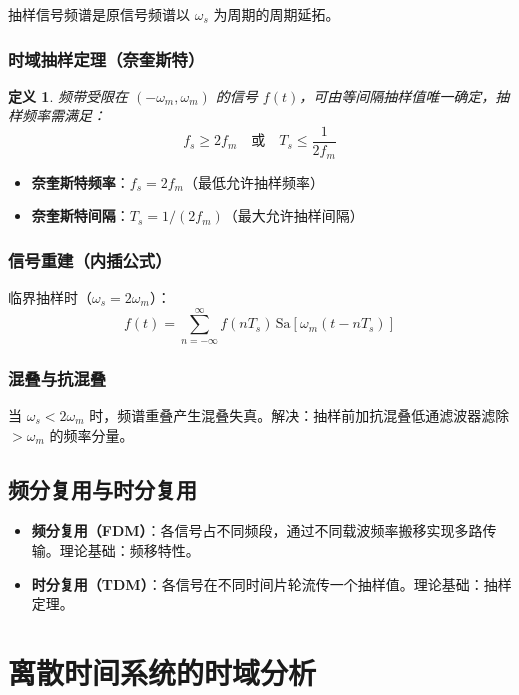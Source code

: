 \documentclass[11pt,a4paper]{ctexart}
\newtheorem{definition}{定义}[section]
\newcommand{\Sa}{\mathrm{Sa}}           %
\begin{document}
抽样信号频谱是原信号频谱以 $\omega_s$ 为周期的周期延拓。

\subsubsection{时域抽样定理（奈奎斯特）}

\begin{definition}
频带受限在 $(-\omega_m, \omega_m)$ 的信号 $f(t)$，可由等间隔抽样值唯一确定，抽样频率需满足：
\[
\boxed{f_s \ge 2f_m}\quad\text{或}\quad\boxed{T_s \le \frac{1}{2f_m}}
\]
\end{definition}

\begin{itemize}
    \item \textbf{奈奎斯特频率}：$f_s = 2f_m$（最低允许抽样频率）
    \item \textbf{奈奎斯特间隔}：$T_s = 1/(2f_m)$（最大允许抽样间隔）
\end{itemize}

\subsubsection{信号重建（内插公式）}
临界抽样时（$\omega_s = 2\omega_m$）：
\[
\boxed{f(t) = \sum_{n=-\infty}^{\infty} f(nT_s)\,\Sa[\omega_m(t - nT_s)]}
\]

\subsubsection{混叠与抗混叠}
当 $\omega_s < 2\omega_m$ 时，频谱重叠产生混叠失真。解决：抽样前加抗混叠低通滤波器滤除 $>\omega_m$ 的频率分量。

\subsection{频分复用与时分复用}
\begin{itemize}
    \item \textbf{频分复用（FDM）}：各信号占不同频段，通过不同载波频率搬移实现多路传输。理论基础：频移特性。
    \item \textbf{时分复用（TDM）}：各信号在不同时间片轮流传一个抽样值。理论基础：抽样定理。
\end{itemize}

\newpage
\section{离散时间系统的时域分析}
\end{document}
